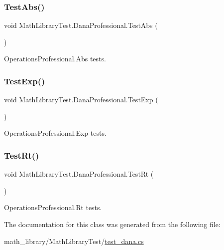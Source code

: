 \subsubsection{\texorpdfstring{Test\+Abs()}{TestAbs()}}
{\footnotesize\ttfamily void Math\+Library\+Test.\+Dana\+Professional.\+Test\+Abs (\begin{DoxyParamCaption}{ }\end{DoxyParamCaption})\hspace{0.3cm}{\ttfamily [inline]}}



Operations\+Professional.\+Abs tests. 

\mbox{\label{classMathLibraryTest_1_1DanaProfessional_a57932b88ac96d31c774b02fe1c23c8ee}} 
\subsubsection{\texorpdfstring{Test\+Exp()}{TestExp()}}
{\footnotesize\ttfamily void Math\+Library\+Test.\+Dana\+Professional.\+Test\+Exp (\begin{DoxyParamCaption}{ }\end{DoxyParamCaption})\hspace{0.3cm}{\ttfamily [inline]}}



Operations\+Professional.\+Exp tests. 

\mbox{\label{classMathLibraryTest_1_1DanaProfessional_a7ab9375202b08f4990dbd7f97fb9ba54}} 
\subsubsection{\texorpdfstring{Test\+Rt()}{TestRt()}}
{\footnotesize\ttfamily void Math\+Library\+Test.\+Dana\+Professional.\+Test\+Rt (\begin{DoxyParamCaption}{ }\end{DoxyParamCaption})\hspace{0.3cm}{\ttfamily [inline]}}



Operations\+Professional.\+Rt tests. 



The documentation for this class was generated from the following file\+:\begin{DoxyCompactItemize}
\item 
math\+\_\+library/\+Math\+Library\+Test/\hyperlink{test__dana_8cs}{test\+\_\+dana.\+cs}\end{DoxyCompactItemize}
